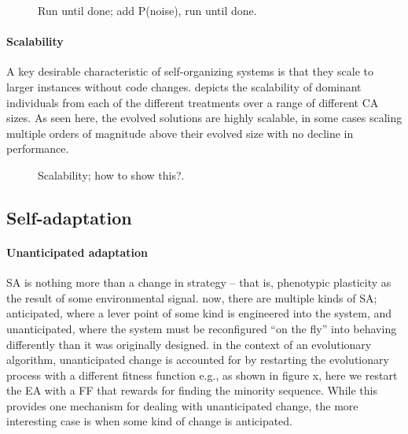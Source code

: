 \begin{figure}
\vspace{10em}
\caption{Run until done; add P(noise), run until done.}
\label{f:resilience}
\end{figure}

\paragraph{Scalability}
A key desirable characteristic of self-organizing systems is that they scale to larger instances without code changes.   depicts the scalability of dominant individuals from each of the different treatments over a range of different CA sizes.  As seen here, the evolved solutions are highly scalable, in some cases scaling multiple orders of magnitude above their evolved size with no decline in performance.

\begin{figure}
\vspace{10em}
\caption{Scalability; how to show this?.}
\label{f:scalability}
\end{figure}

\subsection{Self-adaptation}

%
%
%
%
%

\paragraph{Unanticipated adaptation}
SA is nothing more than a change in strategy -- that is, phenotypic plasticity as the result of some environmental signal.
now, there are multiple kinds of SA; anticipated, where a lever point of some kind is engineered into the system, and unanticipated, where the system must be reconfigured ``on the fly'' into behaving differently than it was originally designed.
in the context of an evolutionary algorithm, unanticipated change is accounted for by restarting the evolutionary process with a different fitness function
e.g., as shown in figure x, here we restart the EA with a FF that rewards for finding the minority sequence.
While this provides one mechanism for dealing with unanticipated change, the more interesting case is when some kind of change is anticipated.

